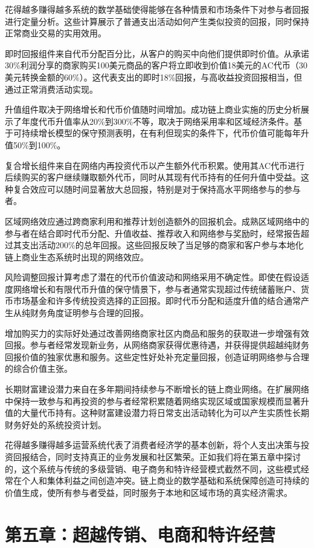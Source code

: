 \documentclass[
  Letterpaper,
]{scrbook}
\begin{document}
花得越多赚得越多系统的数学基础使得能够在各种情景和市场条件下对参与者回报进行定量分析。这些计算展示了普通支出活动如何产生类似投资的回报，同时保持正常商业交易的实用效用。

即时回报组件来自代币分配百分比，从客户的购买中向他们提供即时价值。从承诺30\%利润分享的商家购买100美元商品的客户将立即收到价值18美元的AC代币（30美元转换金额的60\%）。这代表支出的即时18\%回报，与高收益投资回报相当，但通过正常消费活动实现。

升值组件取决于网络增长和代币价值随时间增加。成功链上商业实施的历史分析展示了年度代币升值率从20\%到300\%不等，取决于网络采用率和区域经济条件。基于可持续增长模型的保守预测表明，在有利但现实的条件下，代币价值可能每年升值50\%到100\%。

复合增长组件来自在网络内再投资代币以产生额外代币积累。使用其AC代币进行后续购买的客户继续赚取额外代币，同时从其现有代币持有的任何升值中受益。这种复合效应可以随时间显著放大总回报，特别是对于保持高水平网络参与的参与者。

区域网络效应通过跨商家利用和推荐计划创造额外的回报机会。成熟区域网络中的参与者在结合即时代币分配、升值收益、推荐收入和网络参与奖励时，经常报告超过其支出活动200\%的总年回报。这些回报反映了当足够的商家和客户参与本地化链上商业生态系统时出现的网络效应。

风险调整回报计算考虑了潜在的代币价值波动和网络采用不确定性。即使在假设适度网络增长和有限代币升值的保守情景下，参与者通常实现超过传统储蓄账户、货币市场基金和许多传统投资选择的正回报。即时代币分配和适度升值的结合通常产生从纯财务角度证明参与合理的回报。

增加购买力的实际好处通过改善网络商家社区内商品和服务的获取进一步增强有效回报。参与者经常发现新业务，从网络商家获得优惠待遇，并获得提供超越纯财务回报价值的独家优惠和服务。这些定性好处补充定量回报，创造证明网络参与合理的综合价值主张。

长期财富建设潜力来自在多年期间持续参与不断增长的链上商业网络。在扩展网络中保持一致参与和再投资的参与者经常积累随着网络实现区域或国家规模而显著升值的大量代币持有。这种财富建设潜力将日常支出活动转化为可以产生实质性长期财务好处的系统投资计划。

花得越多赚得越多运营系统代表了消费者经济学的基本创新，将个人支出决策与投资回报结合，同时支持真正的业务发展和社区繁荣。正如我们将在第五章中探讨的，这个系统与传统的多级营销、电子商务和特许经营模式截然不同，这些模式经常在个人和集体利益之间创造冲突。链上商业的数学基础和系统保障创造可持续的价值生成，使所有参与者受益，同时服务于本地和区域市场的真实经济需求。

\chapter{第五章：超越传销、电商和特许经营}\label{sec-beyond-traditional}
\end{document}
